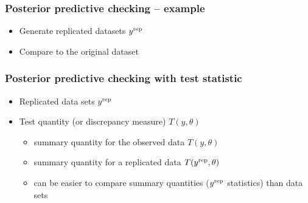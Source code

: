 \documentclass[10pt]{beamer}
\begin{document}
\begin{frame}[fragile]

\frametitle{Posterior predictive checking -- example}

  \begin{itemize}
  \item<1-> Generate replicated datasets $y^{\rm rep}$
  \item<2-> Compare to the original dataset
  \end{itemize}
  \vspace{-1\baselineskip}

\end{frame}


\begin{frame}

\frametitle{Posterior predictive checking with test statistic}

  \begin{itemize}
  \item Replicated data sets $y^{\operatorname{\mathrm{rep}}}$
  \item Test quantity (or discrepancy measure) $T(y,\theta)$
    \begin{itemize}
    \item summary quantity for the observed data $T(y,\theta)$
    \item summary quantity for a replicated data $T(y^{\operatorname{\mathrm{rep}}},\theta)$
    \item can be easier to compare summary quantities ($y^{\operatorname{\mathrm{rep}}}$ statistics) than data sets
    \end{itemize}
  \end{itemize}

\end{frame}
\end{document}
